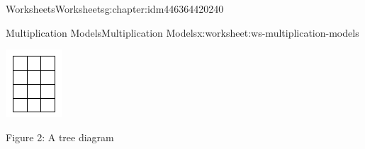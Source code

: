 \documentclass[twoside,11pt,]{book}
\begin{document}
\begin{chapterptx}{Worksheets}{}{Worksheets}{}{}{g:chapter:idm446364420240}
\begin{worksheet-section-numberless}{Multiplication Models}{}{Multiplication Models}{}{}{x:worksheet:ws-multiplication-models}
\begin{introduction}{}
\begin{description}
\begin{sidebyside}{1}{0.45}{0.45}{0}
\begin{sbspanel}{0.1}
\includegraphics[width=1\linewidth]{images/mult-array.png}
\end{sbspanel}%
\end{sidebyside}%
\item[{}]Figure 2: A tree diagram \begin{sidebyside}{1}{0.45}{0.45}{0}%
\begin{sbspanel}{0.1}%

\end{sbspanel}
\end{sidebyside}
\end{description}
\end{introduction}
\end{worksheet-section-numberless}
\end{chapterptx}
\end{document}
